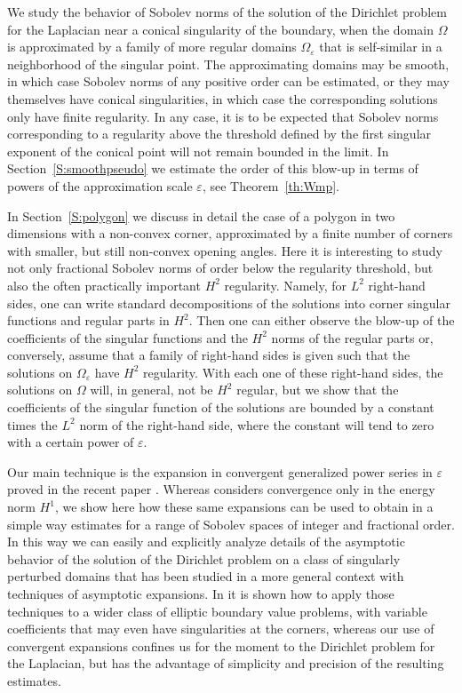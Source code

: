\documentclass[titlepage,12pt]{amsart}
\theoremstyle{definition}
\theoremstyle{remark}
\numberwithin{equation}{section}
\begin{document}
We study the behavior of Sobolev norms of the solution of the Dirichlet problem for the Laplacian near a conical singularity of the boundary, when the domain $\Omega$ is approximated by a family of more regular domains $\Omega_{\varepsilon}$ that is self-similar in a neighborhood of the singular point. 
The approximating domains may be smooth, in which case Sobolev norms of any positive order can be estimated, or they may themselves have conical singularities, in which case the corresponding solutions only have finite regularity. 
In any case, it is to be expected that Sobolev norms corresponding to a regularity above the threshold defined by the first singular exponent of the conical point will not remain bounded in the limit. In Section~\ref{S:smoothpseudo} we estimate the order of this blow-up in terms of powers of the approximation scale $\varepsilon$, see Theorem~\ref{th:Wmp}.

In Section~\ref{S:polygon} we discuss in detail the case of a polygon in two dimensions with a non-convex corner, approximated by a finite number of corners with smaller, but still non-convex opening angles. Here it is interesting to study not only fractional Sobolev norms of order below the regularity threshold, but also the often practically important $H^{2}$ regularity. Namely, for $L^{2}$ right-hand sides, one can write standard decompositions of the solutions into corner singular functions and regular parts in $H^{2}$. Then one can either observe the blow-up of the coefficients of the singular functions and the $H^{2}$ norms of the regular parts or, conversely, assume that a family of right-hand sides is given such that the solutions on $\Omega_{\varepsilon}$ have $H^{2}$ regularity. With each one of these right-hand sides, the solutions on $\Omega$ will, in general, not be $H^{2}$ regular, but we show that the coefficients of the singular function of the solutions are bounded by a constant times the $L^{2}$ norm of the right-hand side, where the constant will tend to zero with a certain power of $\varepsilon$.

Our main technique is the expansion in convergent generalized power series in $\varepsilon$ proved in the recent paper \cite{CoDa2Mu:2024}. Whereas \cite{CoDa2Mu:2024} considers  convergence only in the energy norm $H^{1}$, we show here how these same expansions can be used to obtain in a simple way estimates for a range of Sobolev spaces of integer and fractional order.
In this way we can easily and explicitly analyze details of the asymptotic behavior of the solution of the Dirichlet problem on a class of singularly perturbed domains that has been studied in a more general context with techniques of asymptotic expansions. In \cite{MazNazPla:2000} it is shown how to apply those techniques to a wider class of elliptic boundary value problems, with variable coefficients that may even have singularities at the corners, whereas our use of convergent expansions confines us for the moment to the Dirichlet problem for the Laplacian, but has the advantage of simplicity and precision of the resulting estimates. 
\end{document}

